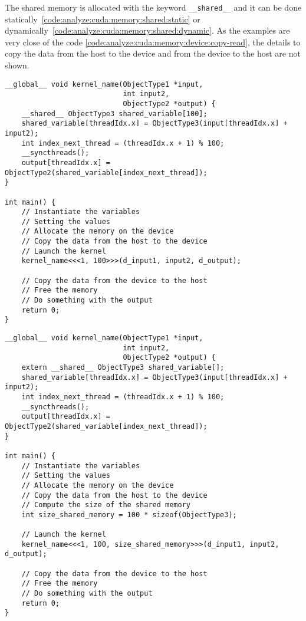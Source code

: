 The shared memory is allocated with the keyword \texttt{\_\_shared\_\_} and it
can be done statically~\ref{code:analyze:cuda:memory:shared:static} or
dynamically~\ref{code:analyze:cuda:memory:shared:dynamic}.
As the examples are very close of the code \ref{code:analyze:cuda:memory:device:copy-read},
the details to copy the data from the host to the device and from the device to
the host are not shown.

\begin{code}
    \label{code:analyze:cuda:memory:shared:static}
    \begin{verbatim}
__global__ void kernel_name(ObjectType1 *input,
                            int input2,
                            ObjectType2 *output) {
    __shared__ ObjectType3 shared_variable[100];
    shared_variable[threadIdx.x] = ObjectType3(input[threadIdx.x] + input2);
    int index_next_thread = (threadIdx.x + 1) % 100;
    __syncthreads();
    output[threadIdx.x] = ObjectType2(shared_variable[index_next_thread]);
}

int main() {
    // Instantiate the variables
    // Setting the values
    // Allocate the memory on the device
    // Copy the data from the host to the device
    // Launch the kernel
    kernel_name<<<1, 100>>>(d_input1, input2, d_output);

    // Copy the data from the device to the host
    // Free the memory
    // Do something with the output
    return 0;
}
    \end{verbatim}
\end{code}

\begin{code}
    \label{code:analyze:cuda:memory:shared:dynamic}
    \begin{verbatim}
__global__ void kernel_name(ObjectType1 *input,
                            int input2,
                            ObjectType2 *output) {
    extern __shared__ ObjectType3 shared_variable[];
    shared_variable[threadIdx.x] = ObjectType3(input[threadIdx.x] + input2);
    int index_next_thread = (threadIdx.x + 1) % 100;
    __syncthreads();
    output[threadIdx.x] = ObjectType2(shared_variable[index_next_thread]);
}

int main() {
    // Instantiate the variables
    // Setting the values
    // Allocate the memory on the device
    // Copy the data from the host to the device
    // Compute the size of the shared memory
    int size_shared_memory = 100 * sizeof(ObjectType3);

    // Launch the kernel
    kernel_name<<<1, 100, size_shared_memory>>>(d_input1, input2, d_output);

    // Copy the data from the device to the host
    // Free the memory
    // Do something with the output
    return 0;
}
    \end{verbatim}
\end{code}


